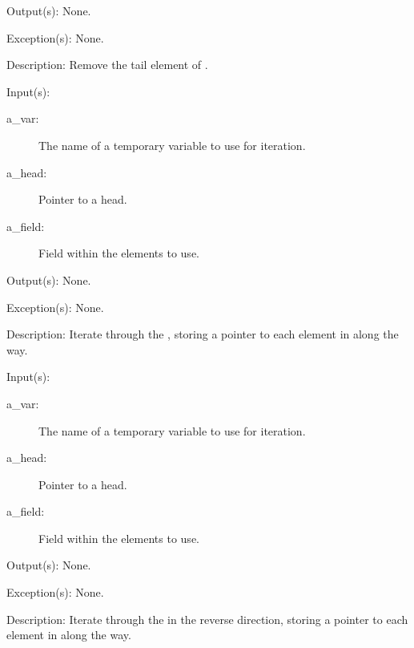 \begin{capi}
\begin{capilist}
\begin{description}
		\end{description}
	\item[Output(s): ] None.
	\item[Exception(s): ] None.
	\item[Description: ]
		Remove the tail element of .
	\end{capilist}
\label{ql_foreach}
	\begin{capilist}
	\item[Input(s): ]
		\begin{description}\item[]
		\item[a\_var: ]
			The name of a temporary variable to use for iteration.
		\item[a\_head: ]
			Pointer to a  head.
		\item[a\_field: ]
			Field within the  elements to use.
		\end{description}
	\item[Output(s): ] None.
	\item[Exception(s): ] None.
	\item[Description: ]
		Iterate through the , storing a pointer to each
		element in  along the way.
	\end{capilist}
\label{ql_reverse_foreach}
	\begin{capilist}
	\item[Input(s): ]
		\begin{description}\item[]
		\item[a\_var: ]
			The name of a temporary variable to use for iteration.
		\item[a\_head: ]
			Pointer to a \classname{ql} head.
		\item[a\_field: ]
			Field within the  elements to use.
		\end{description}
	\item[Output(s): ] None.
	\item[Exception(s): ] None.
	\item[Description: ]
		Iterate through the  in the reverse direction,
		storing a pointer to each element in  along the
		way.
	\end{capilist}
\end{capi}
